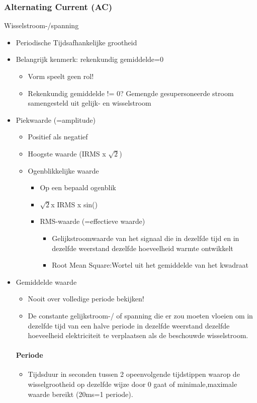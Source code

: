\documentclass[12pt]{article}
\begin{document}
\subsubsection{Alternating Current (AC)}
Wisselstroom-/spanning
\begin{itemize}
    \item Periodische Tijdsafhankelijke grootheid
    \item Belangrijk kenmerk: rekenkundig gemiddelde=0\begin{itemize}
        \item Vorm speelt geen rol!
        \item Rekenkundig gemiddelde != 0? Gemengde gesupersoneerde stroom samengesteld uit gelijk- en wisselstroom
    \end{itemize}
    \item Piekwaarde (=amplitude)\begin{itemize}
        \item Positief als negatief
        \item Hoogste waarde (IRMS x $\sqrt{2}$)
    \item Ogenblikkelijke waarde\begin{itemize}
        \item Op een bepaald ogenblik 
        \item $\sqrt{2}$x IRMS x sin()
    \item RMS-waarde (=effectieve waarde)\begin{itemize}
        \item Gelijkstroomwaarde van het signaal die in dezelfde tijd en in dezelfde weerstand dezelfde hoeveelheid warmte ontwikkelt
        \item Root Mean Square:Wortel uit het gemiddelde van het kwadraat
    \end{itemize}
    \end{itemize}
    \end{itemize}
    \item Gemiddelde waarde\begin{itemize}
        \item Nooit over volledige periode bekijken!
        \item De constante gelijkstroom-/ of spanning die er zou moeten vloeien om in dezelfde tijd van een halve periode in dezelfde weerstand dezelfde hoeveelheid elektriciteit te verplaatsen als de beschouwde wisselstroom.
    \end{itemize}
\paragraph{Periode}
\begin{itemize}
    \item Tijdsduur in seconden tussen 2 opeenvolgende tijdstippen waarop de wisselgrootheid op dezelfde wijze door 0 gaat of minimale,maximale waarde bereikt (20ms=1 periode).

\end{itemize}
\end{itemize}
\end{document}
